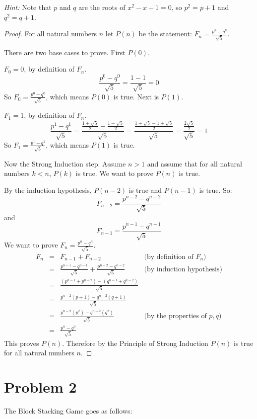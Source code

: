 \documentclass[14pt]{extarticle}
\begin{document}
\textit{Hint:} Note that $p$ and $q$ are the roots of $x^2 - x - 1 = 0$, so $p^2 = p+1$ and $q^2 = q+1$.
\begin{proof}
For all natural numbers $n$ let $P(n)$ be the statement: $F_n = \frac{p^n - q^n}{\sqrt{5}}$.

There are two base cases to prove. First $P(0)$.

$F_0 = 0$, by definition of $F_n$. 
$$
\frac{p^0 - q^0}{\sqrt{5}} = \frac{1 - 1}{\sqrt{5}} = 0
$$
So $\displaystyle F_0 = \frac{p^0 - q^0}{\sqrt{5}}$, which means $P(0)$ is true. Next is $P(1)$.

$F_1 = 1$, by definition of $F_n$. 
$$
\frac{p^1 - q^1}{\sqrt{5}} = \frac{\frac{1 + \sqrt{5}}{2} - \frac{1 - \sqrt{5}}{2}}{\sqrt{5}} = \frac{\frac{1 + \sqrt{5} - 1 + \sqrt{5}}{2}}{\sqrt{5}} = \frac{\frac{2\sqrt{5}}{2}}{\sqrt{5}} = 1
$$
So $\displaystyle F_1 = \frac{p^1 - q^1}{\sqrt{5}}$, which means $P(1)$ is true.

Now the Strong Induction step. Assume $n > 1$ and assume that for all natural numbers $k < n$, $P(k)$ is true. We want to prove $P(n)$ is true.

By the induction hypothesis, $P(n - 2)$ is true and $P(n - 1)$ is true. So:
$$
F_{n-2} = \frac{p^{n-2} - q^{n-2}}{\sqrt{5}}
$$
and
$$
F_{n-1} = \frac{p^{n-1} - q^{n-1}}{\sqrt{5}}
$$
We want to prove $\displaystyle F_{n} = \frac{p^{n} - q^{n}}{\sqrt{5}}$.
$$
\begin{array}{cccc}
F_n & = & F_{n-1} + F_{n-2} & \text{(by definition of } F_n) \\
 & = & \displaystyle \frac{p^{n-1} - q^{n-1}}{\sqrt{5}} + \frac{p^{n-2} - q^{n-2}}{\sqrt{5}}& \text{(by induction hypothesis)}\\
 & = & \displaystyle \frac{(p^{n-1} + p^{n-2}) - (q^{n-1} + q^{n-2})}{\sqrt{5}} & \\
 & = & \displaystyle \frac{p^{n-2}(p + 1) - q^{n-2}(q + 1)}{\sqrt{5}} & \\
 & = & \displaystyle \frac{p^{n-2}(p^2) - q^{n-2}(q^2)}{\sqrt{5}} & \text{(by the properties of }p, q) \\
 & = &\displaystyle \frac{p^{n} - q^{n}}{\sqrt{5}} & 
\end{array}
$$
This proves $P(n)$. Therefore by the Principle of Strong Induction $P(n)$ is true for all natural numbers $n$.
\end{proof}

\section{Problem 2}
The Block Stacking Game goes as follows: 
\end{document}
